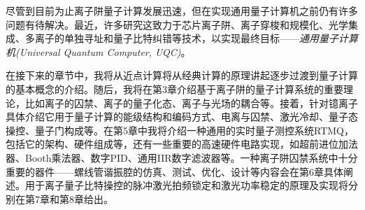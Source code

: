 尽管到目前为止离子阱量子计算发展迅速，但在实现通用量子计算机之前仍有许多问题有待解决。最近，许多研究这致力于芯片离子阱\cite[]{Mehta_Eltony_Bruzewicz_Chuang_Ram_Sage_Chiaverini_2014}、离子穿梭和规模化\cite[]{Monroe_Kim_2013, Sterling_Rattanasonti_Weidt_Lake_Srinivasan_Webster_Kraft_Hensinger_2014, Lee_Jeong_Park_Jung_Kim_Cho_2021}、光学集成\cite[]{Niffenegger_Stuart_Sorace_Agaskar_Kharas_Bramhavar_Bruzewicz_Loh_Maxson_McConnell_Reens_et_al_2020, Mehta_Zhang_Malinowski_Nguyen_Stadler_Home_2020}、多离子的单独寻址\cite[]{Ivory_Setzer_Karl_McGuinness_DeRose_Blain_Stick_Gehl_Parazzoli_2020}和量子比特纠错\cite[]{Cramer_Kalb_Rol_Hensen_Blok_Markham_Twitchen_Hanson_Taminiau_2016,Reichardt_2021}等技术，以实现最终目标——\emph{通用量子计算机(Universal Quantum Computer, UQC)}。

在接下来的章节中，我将从近点计算将从经典计算的原理讲起逐步过渡到量子计算的基本概念的介绍。随后，我将在第3章介绍基于离子阱的量子计算系统的重要理论，比如离子的囚禁、离子的量子化态、离子与光场的耦合等。接着，针对镱离子具体介绍它用于量子计算的能级结构和编码方式、电离与囚禁、激光冷却、量子态操控、量子门构成等。在第5章中我将介绍一种通用的实时量子测控系统RTMQ，包括它的架构、硬件组成等，还有一些重要的高速硬件电路实现，如超前进位加法器、Booth乘法器、数字PID、通用IIR数字滤波器等。一种离子阱囚禁系统中十分重要的器件——螺线管谐振腔的仿真、测试、优化、设计等内容会在第6章具体阐述。用于离子量子比特操控的脉冲激光拍频锁定和激光功率稳定的原理及实现将分别在第7章和第8章给出。